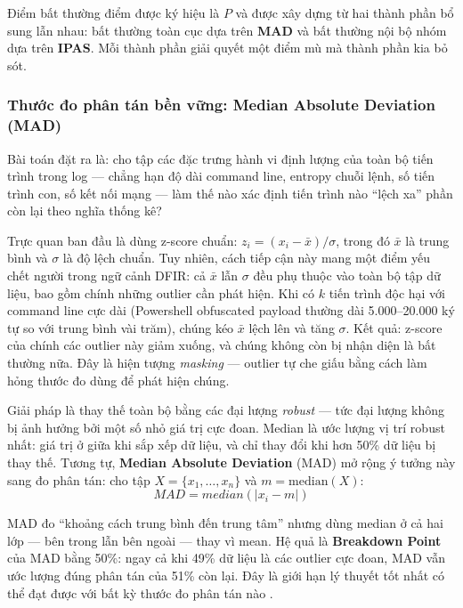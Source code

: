 \documentclass[../main.tex]{subfiles}
\begin{document}
Điểm bất thường điểm được ký hiệu là $P$ và được xây dựng từ hai thành phần bổ sung lẫn nhau: bất thường toàn cục dựa trên \textbf{MAD} và bất thường nội bộ nhóm dựa trên \textbf{IPAS}. Mỗi thành phần giải quyết một điểm mù mà thành phần kia bỏ sót.

\subsubsection{Thước đo phân tán bền vững: Median Absolute Deviation (MAD)}
\label{subsubsection:2.4.2.1}

Bài toán đặt ra là: cho tập các đặc trưng hành vi định lượng của toàn bộ tiến trình trong log — chẳng hạn độ dài command line, entropy chuỗi lệnh, số tiến trình con, số kết nối mạng — làm thế nào xác định tiến trình nào ``lệch xa'' phần còn lại theo nghĩa thống kê?

Trực quan ban đầu là dùng z-score chuẩn: $z_i = (x_i - \bar{x}) / \sigma$, trong đó $\bar{x}$ là trung bình và $\sigma$ là độ lệch chuẩn. Tuy nhiên, cách tiếp cận này mang một điểm yếu chết người trong ngữ cảnh DFIR: cả $\bar{x}$ lẫn $\sigma$ đều phụ thuộc vào toàn bộ tập dữ liệu, bao gồm chính những outlier cần phát hiện. Khi có $k$ tiến trình độc hại với command line cực dài (Powershell obfuscated payload thường dài 5.000–20.000 ký tự so với trung bình vài trăm), chúng kéo $\bar{x}$ lệch lên và tăng $\sigma$. Kết quả: z-score của chính các outlier này giảm xuống, và chúng không còn bị nhận diện là bất thường nữa. Đây là hiện tượng \textit{masking} — outlier tự che giấu bằng cách làm hỏng thước đo dùng để phát hiện chúng.

Giải pháp là thay thế toàn bộ bằng các đại lượng \textit{robust} — tức đại lượng không bị ảnh hưởng bởi một số nhỏ giá trị cực đoan. Median là ước lượng vị trí robust nhất: giá trị ở giữa khi sắp xếp dữ liệu, và chỉ thay đổi khi hơn 50\% dữ liệu bị thay thế. Tương tự, \textbf{Median Absolute Deviation} (MAD) mở rộng ý tưởng này sang đo phân tán: cho tập $X = \{x_1, \ldots, x_n\}$ và $m = \text{median}(X)$:
\begin{equation}
    MAD = median(|x_i - m|) \tag{1.6}
\end{equation}

MAD đo ``khoảng cách trung bình đến trung tâm'' nhưng dùng median ở cả hai lớp — bên trong lẫn bên ngoài — thay vì mean. Hệ quả là \textbf{Breakdown Point} của MAD bằng 50\%: ngay cả khi 49\% dữ liệu là các outlier cực đoan, MAD vẫn ước lượng đúng phân tán của 51\% còn lại. Đây là giới hạn lý thuyết tốt nhất có thể đạt được với bất kỳ thước đo phân tán nào \cite{Rousseeuw1993}.
\end{document}
